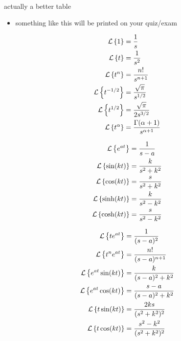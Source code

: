 \documentclass[urlcolor=blue,dvipsnames]{beamer}
\begin{document}
\begin{frame}{actually a better table}

\small
\begin{itemize}
\item something like this will be printed on your quiz/exam
\end{itemize}

\vspace{-3mm}
\tiny
\begin{minipage}[t]{0.3\textwidth}
\begin{align*}
\mathcal{L}\left\{1\right\} &= \frac{1}{s} \\
\mathcal{L}\left\{t\right\} &= \frac{1}{s^2} \\
\mathcal{L}\left\{t^n\right\} &= \frac{n!}{s^{n+1}} \\
\mathcal{L}\left\{t^{-1/2}\right\} &= \frac{\sqrt{\pi}}{s^{1/2}} \\
\mathcal{L}\left\{t^{1/2}\right\} &= \frac{\sqrt{\pi}}{2s^{3/2}} \\
\mathcal{L}\left\{t^\alpha\right\} &= \frac{\Gamma(\alpha+1)}{s^{\alpha+1}}
\end{align*}
\end{minipage}
\begin{minipage}[t]{0.3\textwidth}
\begin{align*}
\mathcal{L}\left\{e^{at}\right\} &= \frac{1}{s-a} \\
\mathcal{L}\left\{\sin(kt)\right\} &= \frac{k}{s^2+k^2} \\
\mathcal{L}\left\{\cos(kt)\right\} &= \frac{s}{s^2+k^2} \\
\mathcal{L}\left\{\sinh(kt)\right\} &= \frac{k}{s^2-k^2} \\
\mathcal{L}\left\{\cosh(kt)\right\} &= \frac{s}{s^2-k^2}
\end{align*}
\end{minipage}
\begin{minipage}[t]{0.3\textwidth}
\begin{align*}
\mathcal{L}\left\{te^{at}\right\} &= \frac{1}{(s-a)^2} \\
\mathcal{L}\left\{t^n e^{at}\right\} &= \frac{n!}{(s-a)^{n+1}} \\
\mathcal{L}\left\{e^{at}\sin(kt)\right\} &= \frac{k}{(s-a)^2+k^2} \\
\mathcal{L}\left\{e^{at}\cos(kt)\right\} &= \frac{s-a}{(s-a)^2+k^2} \\
\mathcal{L}\left\{t\sin(kt)\right\} &= \frac{2ks}{(s^2+k^2)^2} \\
\mathcal{L}\left\{t\cos(kt)\right\} &= \frac{s^2-k^2}{(s^2+k^2)^2}
\end{align*}
\end{minipage}


\end{frame}
\end{document}
